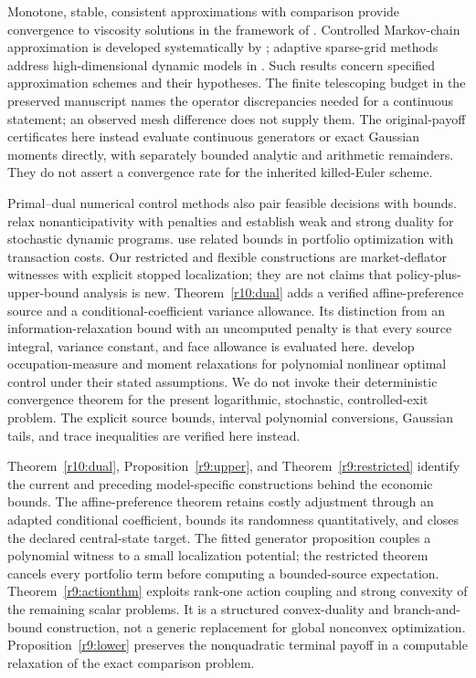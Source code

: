 Monotone, stable, consistent approximations with comparison provide convergence to viscosity solutions in the framework of \citet{barles1991}. Controlled Markov-chain approximation is developed systematically by \citet{kushner2001}; adaptive sparse-grid methods address high-dimensional dynamic models in \citet{brumm2017}. Such results concern specified approximation schemes and their hypotheses. The finite telescoping budget in the preserved manuscript names the operator discrepancies needed for a continuous statement; an observed mesh difference does not supply them. The original-payoff certificates here instead evaluate continuous generators or exact Gaussian moments directly, with separately bounded analytic and arithmetic remainders. They do not assert a convergence rate for the inherited killed-Euler scheme.

Primal--dual numerical control methods also pair feasible decisions with bounds. \citet{brown2010} relax nonanticipativity with penalties and establish weak and strong duality for stochastic dynamic programs. \citet{brown2011} use related bounds in portfolio optimization with transaction costs. Our restricted and flexible constructions are market-deflator witnesses with explicit stopped localization; they are not claims that policy-plus-upper-bound analysis is new. Theorem~\ref{r10:dual} adds a verified affine-preference source and a conditional-coefficient variance allowance. Its distinction from an information-relaxation bound with an uncomputed penalty is that every source integral, variance constant, and face allowance is evaluated here. \citet{lasserre2008} develop occupation-measure and moment relaxations for polynomial nonlinear optimal control under their stated assumptions. We do not invoke their deterministic convergence theorem for the present logarithmic, stochastic, controlled-exit problem. The explicit source bounds, interval polynomial conversions, Gaussian tails, and trace inequalities are verified here instead.

Theorem~\ref{r10:dual}, Proposition~\ref{r9:upper}, and Theorem~\ref{r9:restricted} identify the current and preceding model-specific constructions behind the economic bounds. The affine-preference theorem retains costly adjustment through an adapted conditional coefficient, bounds its randomness quantitatively, and closes the declared central-state target. The fitted generator proposition couples a polynomial witness to a small localization potential; the restricted theorem cancels every portfolio term before computing a bounded-source expectation. Theorem~\ref{r9:actionthm} exploits rank-one action coupling and strong convexity of the remaining scalar problems. It is a structured convex-duality and branch-and-bound construction, not a generic replacement for global nonconvex optimization. Proposition~\ref{r9:lower} preserves the nonquadratic terminal payoff in a computable relaxation of the exact comparison problem.

